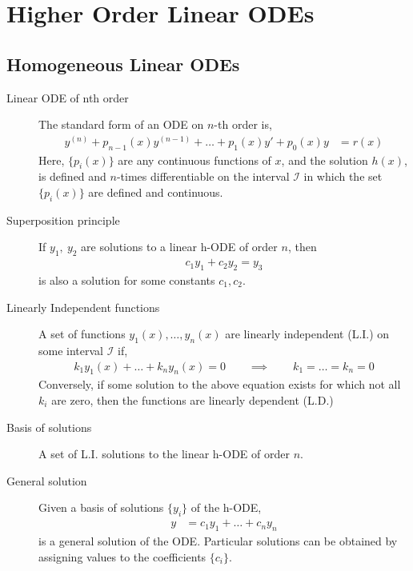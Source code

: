\chapter{Higher Order Linear ODEs}
\section{Homogeneous Linear ODEs}

\begin{description}
    \item[Linear ODE of nth order] The standard form of an ODE on $ n $-th order is,
        \begin{align}
            y^{(n)} + p_{n-1}(x)y^{(n-1)} + \dots + p_{1}(x)y' + p_{0}(x)y & = r(x)
        \end{align}
        Here, $ \{p_{i}(x)\} $ are any continuous functions of $ x $, and the solution
        $ h(x) $, is defined and $ n $-times differentiable on the interval $ \mathcal{I} $
        in which the set $ \{p_{i}(x)\} $ are defined and continuous.
    \item[Superposition principle] If $ y_{1},\ y_{2} $ are solutions to a linear h-ODE
        of order $ n $, then
        \begin{align}
            c_{1}y_{1} + c_{2}y_{2} = y_{3}
        \end{align}
        is also a solution for some constants $ c_{1}, c_{2} $.
    \item[Linearly Independent functions] A set of functions $ y_{1}(x), \dots, y_{n}(x) $
        are linearly independent (L.I.) on some interval $ \mathcal{I} $ if,
        \begin{align}
            k_{1}y_{1}(x) + \dots + k_{n}y_{n}(x) = 0 \qquad \implies \qquad
            k_{1} = \dots = k_{n} = 0
        \end{align}
        Conversely, if some solution to the above equation exists for which not all $ k_{i} $
        are zero, then the functions are linearly dependent (L.D.)
    \item[Basis of solutions] A set of L.I. solutions to the linear h-ODE of order $ n $.
    \item[General solution] Given a basis of solutions $ \{y_{i}\} $ of the h-ODE,
        \begin{align}
            y & = c_{1}y_{1} + \dots + c_{n}y_{n}
        \end{align}
        is a general solution of the ODE. Particular solutions can be obtained by assigning
        values to the coefficients $ \{c_{i}\} $. \par

\end{description}
